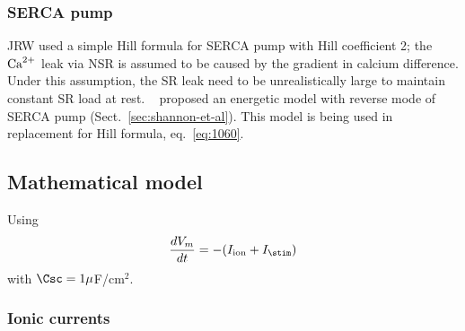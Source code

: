\subsubsection{SERCA pump}
\label{sec:Ca-buffer_SERCA-1}

JRW used a simple Hill formula for SERCA pump with Hill coefficient 2; the ${\text{Ca}^{2+}}$
leak via NSR is assumed to be caused by the gradient in calcium difference.
Under this assumption, the SR leak need to be unrealistically large to maintain
constant SR load at rest.
~\citep{shannon1998} proposed an energetic model with reverse mode of SERCA
pump (Sect.~\ref{sec:shannon-et-al}). This model is being used in replacement
for Hill formula, eq.~\eqref{eq:1060}.

\subsection{Mathematical model}
\label{sec:mathematical-model-20}

Using
\begin{equation}
  \label{eq:1321}
  \frac{dV_m }{dt} = -(I_\ion + I_\stim)
\end{equation}
with $\Csc = 1\mu$F/cm$^2$. 

\subsubsection{Ionic currents}
\label{sec:ionic-currents-8}

